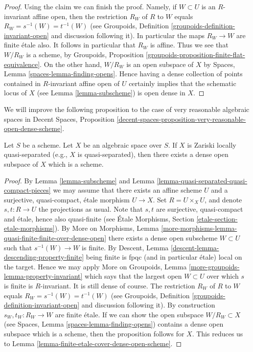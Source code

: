 \begin{proof}
\medskip\noindent
Using the claim we can finish the proof. Namely, if $W \subset U$ is
an $R$-invariant affine open, then the restriction $R_W$ of $R$ to $W$
equals $R_W = s^{-1}(W) = t^{-1}(W)$ (see
Groupoids, Definition \ref{groupoids-definition-invariant-open}
and discussion following it). In particular the maps $R_W \to W$ are
finite \'etale also. It follows in particular that $R_W$ is affine.
Thus we see that $W/R_W$ is a scheme, by
Groupoids, Proposition \ref{groupoids-proposition-finite-flat-equivalence}.
On the other hand, $W/R_W$ is an open subspace of $X$ by
Spaces, Lemma \ref{spaces-lemma-finding-opens}.
Hence having a dense collection of points contained in $R$-invariant
affine open of $U$ certainly implies that the schematic locus of $X$
(see Lemma \ref{lemma-subscheme})
is open dense in $X$.
\end{proof}

\noindent
We will improve the following proposition to the case of
very reasonable algebraic spaces in
Decent Spaces, Proposition
\ref{decent-spaces-proposition-very-reasonable-open-dense-scheme}.

\begin{proposition}
\label{proposition-locally-quasi-separated-open-dense-scheme}
Let $S$ be a scheme. Let $X$ be an algebraic space over $S$.
If $X$ is Zariski locally quasi-separated (e.g., $X$ is quasi-separated),
then there exists a dense open subspace of $X$ which is a scheme.
\end{proposition}

\begin{proof}
By
Lemma \ref{lemma-subscheme}
and
Lemma \ref{lemma-quasi-separated-quasi-compact-pieces}
we may assume that there exists an affine scheme $U$ and a
surjective, quasi-compact, \'etale morphism $U \to X$.
Set $R = U \times_X U$, and denote $s, t : R \to U$ the projections
as usual. Note that $s, t$ are surjective, quasi-compact and \'etale, hence
also quasi-finite (see
\'Etale Morphisms, Section \ref{etale-section-etale-morphisms}).
By
More on Morphisms,
Lemma \ref{more-morphisms-lemma-quasi-finite-finite-over-dense-open}
there exists a dense open subscheme $W \subset U$ such that
$s^{-1}(W) \to W$ is finite. By
Descent, Lemma \ref{descent-lemma-descending-property-finite}
being finite is fpqc (and in particular \'etale) local on the target.
Hence we may apply
More on Groupoids, Lemma \ref{more-groupoids-lemma-property-invariant}
which says that the largest open $W \subset U$ over which $s$ is
finite is $R$-invariant. It is still dense of course.
The restriction $R_W$ of $R$ to $W$ equals $R_W = s^{-1}(W) = t^{-1}(W)$
(see Groupoids, Definition \ref{groupoids-definition-invariant-open}
and discussion following it).
By construction $s_W, t_W : R_W \to W$ are finite \'etale.
If we can show the open subspace $W/R_W \subset X$ (see
Spaces, Lemma \ref{spaces-lemma-finding-opens})
contains a dense open subspace which is a scheme, then the
proposition follows for $X$. This reduces us to
Lemma \ref{lemma-finite-etale-cover-dense-open-scheme}.
\end{proof}







